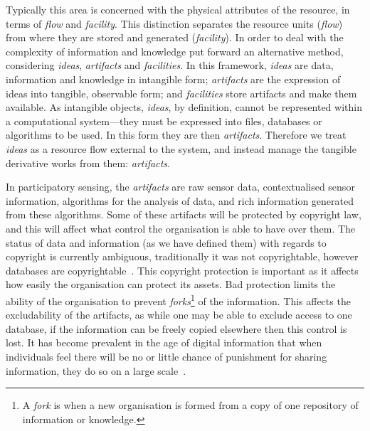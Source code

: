 Typically this area is concerned with the physical attributes of the resource, in terms of \emph{flow} and \emph{facility}. This distinction separates the resource units (\emph{flow}) from where they are stored and generated (\emph{facility}). In order to deal with the complexity of information and knowledge  put forward an alternative method, considering \emph{ideas}, \emph{artifacts} and \emph{facilities}. 
In this framework, \emph{ideas} are data, information and knowledge in intangible form; \emph{artifacts} are the expression of ideas into tangible, observable form; and \emph{facilities} store artifacts and make them available. 
As intangible objects, \emph{ideas}, by definition, cannot be represented within a computational system---they must be expressed into files, databases or algorithms to be used. In this form they are then \emph{artifacts}. Therefore we treat \emph{ideas} as a resource flow external to the system, and instead manage the tangible derivative works from them: \emph{artifacts}.

In participatory sensing, the \emph{artifacts} are raw sensor data,
contextualised sensor information, algorithms for the analysis of data, and
rich information generated from these algorithms. Some of these artifacts will
be protected by copyright law, and this will affect what control the
organisation is able to have over them. The status of data and information (as
we have defined them) with regards to copyright is currently ambiguous,
traditionally it was not copyrightable, however databases are
copyrightable~\citep{Miller2008}. This copyright protection is important as it
affects how easily the organisation can protect its assets. Bad protection
limits the ability of the organisation to prevent \emph{forks}\footnote{A \emph{fork} is when a new organisation is formed from a copy of one repository of information or knowledge.} of the
information. This affects the excludability of the artifacts, as while one may
be able to exclude access to one database, if the information can be freely
copied elsewhere then this control is lost. It has become prevalent in the age
of digital information that when individuals feel there will be no or little
chance of punishment for sharing information, they do so on a large
scale~\citep[pp.\ 62--66]{Lessig2004}.

